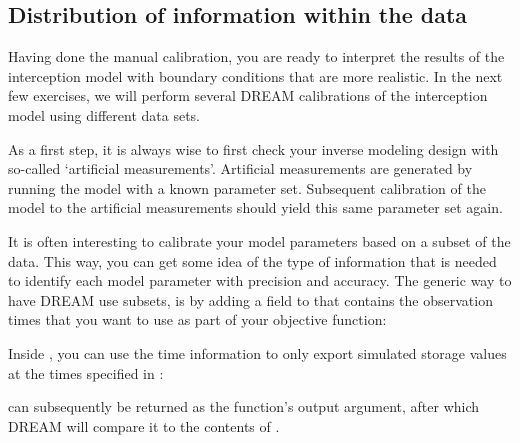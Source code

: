 \subsection{Distribution of information within the data}

Having done the manual calibration, you are ready to interpret the results of
the interception model with boundary conditions that are more realistic. In the
next few exercises, we will perform several DREAM calibrations of the
interception model using  different data sets.

As a first step, it is always wise to first check your inverse modeling design
with so-called `artificial measurements'. Artificial measurements are generated
by running the model with a known parameter set. Subsequent calibration of the
model to the artificial measurements should yield this same parameter set again.



It is often interesting to calibrate your model parameters based on a subset of
the data. This way, you can get some idea of the type of information that is
needed to identify each model parameter with precision and accuracy. The generic
way to have DREAM use subsets, is by adding a field to  that
contains the observation times that you want to use as part of your objective
function:

Inside , you can use the time
information to only export simulated storage values at the times specified in
:

 can subsequently be returned as the function's output argument,
after which DREAM will compare it to the contents of
.


